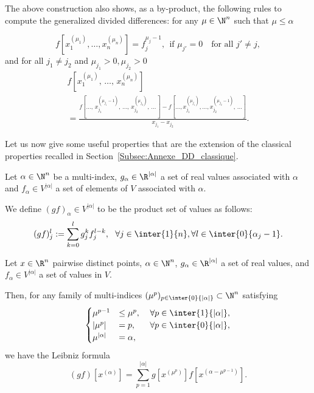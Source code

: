 The above construction also shows, as a by-product, the following rules to compute the generalized divided differences: for any $\mu\in \N^n$ such that $\mu\leq \alpha$

\begin{equation}\label{rule1}
f\left[x_1^{(\mu_1)},\dotsc,x_n^{(\mu_n)}\right] = f_j^{\mu_j-1}, \ \ \text{if }\mu_{j'}=0\quad\text{for all }j'\neq j,
\end{equation}
and for all $j_1\neq j_2$ and $\mu_{j_1}>0, \mu_{j_2}>0$
\begin{multline}\label{rule2}
f\left[x_1^{(\mu_1)}\!\!,\,\dotsc,\,x_n^{(\mu_n)}\right]\\
= \frac{f\left[\dotsc,\,x_{j_1}^{(\mu_{j_1}-1)}\!,\,\dotsc,\,x_{j_2}^{(\mu_{j_2})}\!,\,\dotsc\,\right] - f\left[\dotsc,x_{j_1}^{(\mu_{j_1})}\!,\dotsc,x_{j_2}^{(\mu_{j_2}-1)}\!,\,\dotsc\right]}{x_{j_1}-x_{j_2}}.
\end{multline}



Let us now give some useful properties that are the extension of the classical properties recalled in Section~\ref{Subsec:Annexe_DD_classique}.
\begin{defi}\label{Defi:produit_GDD}
Let $\alpha\in \N^n$ be a multi-index, $g_\alpha\in \R^{|\alpha|}$ a set of real values associated with $\alpha$ and $f_\alpha\in V^{|\alpha|}$ a set of elements of $V$ associated with $\alpha$.

We define $(gf)_\alpha\in V^{|\alpha|}$ to be the product set of values as follows:
\[
(gf)_j^l := \sum_{k=0}^l g_j^k f_j^{l-k}, \ \ \forall j\in \inter{1}{n}, \forall l\in \inter{0}{\alpha_j-1}.
\]
\end{defi}

\begin{prop}\label{Prop:GDD_Leibniz}
Let $x\in \R^n$ pairwise distinct points, $\alpha\in \N^n$, $g_\alpha\in \R^{|\alpha|}$ a set of real values, and $f_\alpha\in V^{|\alpha|}$ a set of values in $V$.

Then, for any family of multi-indices $(\mu^p)_{p\in \inter{0}{|\alpha|}} \subset \N^n $ satisfying
\begin{equation}\label{prop_muk}
\begin{cases}
\mu^{p-1}&\leq \mu^{p}, \mkern20mu \forall p\in\inter{1}{|\alpha|},\\
|\mu^p| &= p, \mkern30mu \forall p\in \inter{0}{|\alpha|},\\
\mu^{|\alpha|}&=\alpha,
\end{cases}
\end{equation}
we have the Leibniz formula
\[
(gf)\left[x^{(\alpha)}\right] = \sum_{p=1}^{|\alpha|} g\left[x^{(\mu^p)}\right] f\left[x^{(\alpha-\mu^{p-1})}\right].
\]
\end{prop}

